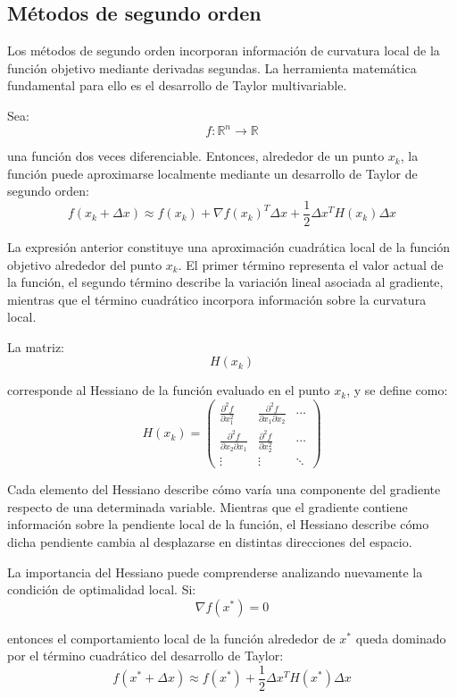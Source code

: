 \subsection{Métodos de segundo orden}

Los métodos de segundo orden incorporan información de curvatura local de la función objetivo mediante derivadas segundas. La herramienta matemática fundamental para ello es el desarrollo de Taylor multivariable.

Sea:
\[
f:\mathbb{R}^n\rightarrow\mathbb{R}
\]

una función dos veces diferenciable. Entonces, alrededor de un punto \(x_k\), la función puede aproximarse localmente mediante un desarrollo de Taylor de segundo orden:
\[
f(x_k+\Delta x)
\approx
f(x_k)
+
\nabla f(x_k)^T\Delta x
+
\frac{1}{2}\Delta x^TH(x_k)\Delta x
\]

La expresión anterior constituye una aproximación cuadrática local de la función objetivo alrededor del punto \(x_k\). El primer término representa el valor actual de la función, el segundo término describe la variación lineal asociada al gradiente, mientras que el término cuadrático incorpora información sobre la curvatura local.

La matriz:
\[
H(x_k)
\]

corresponde al Hessiano de la función evaluado en el punto \(x_k\), y se define como:
\[
H(x_k)=
\begin{pmatrix}
\frac{\partial^2f}{\partial x_1^2}
&
\frac{\partial^2f}{\partial x_1\partial x_2}
&
\cdots
\\
\frac{\partial^2f}{\partial x_2\partial x_1}
&
\frac{\partial^2f}{\partial x_2^2}
&
\cdots
\\
\vdots
&
\vdots
&
\ddots
\end{pmatrix}
\]

Cada elemento del Hessiano describe cómo varía una componente del gradiente respecto de una determinada variable. Mientras que el gradiente contiene información sobre la pendiente local de la función, el Hessiano describe cómo dicha pendiente cambia al desplazarse en distintas direcciones del espacio.

La importancia del Hessiano puede comprenderse analizando nuevamente la condición de optimalidad local. Si:
\[
\nabla f(x^*)=0
\]

entonces el comportamiento local de la función alrededor de \(x^*\) queda dominado por el término cuadrático del desarrollo de Taylor:
\[
f(x^*+\Delta x)
\approx
f(x^*)
+
\frac{1}{2}\Delta x^TH(x^*)\Delta x
\]

